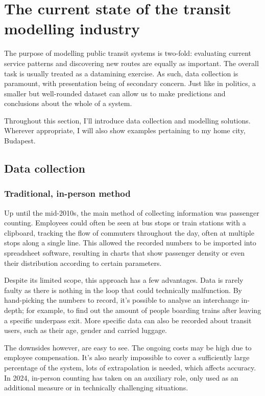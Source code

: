 \chapter{The current state of the transit modelling industry}
The purpose of modelling public transit systems is two-fold: evaluating current service patterns and discovering new routes are equally as important. The overall task is usually treated as a datamining exercise. As such, data collection is paramount, with presentation being of secondary concern. Just like in politics, a smaller but well-rounded dataset can allow us to make predictions and conclusions about the whole of a system.

Throughout this section, I'll introduce data collection and modelling solutions. Wherever appropriate, I will also show examples pertaining to my home city, Budapest.

\section{Data collection}
\subsection{Traditional, in-person method}

Up until the mid-2010s, the main method of collecting information was passenger counting. Employees could often be seen at bus stops or train stations with a clipboard, tracking the flow of commuters throughout the day, often at multiple stops along a single line. This allowed the recorded numbers to be imported into spreadsheet software, resulting in charts that show passenger density or even their distribution according to certain parameters.

Despite its limited scope, this approach has a few advantages. Data is rarely faulty as there is nothing in the loop that could technically malfunction. By hand-picking the numbers to record, it's possible to analyse an interchange in-depth; for example, to find out the amount of people boarding trains after leaving a specific underpass exit. More specific data can also be recorded about transit users, such as their age, gender and carried luggage.

The downsides however, are easy to see. The ongoing costs may be high due to employee compensation. It's also nearly impossible to cover a sufficiently large percentage of the system, lots of extrapolation is needed, which affects accuracy. In 2024, in-person counting has taken on an auxiliary role, only used as an additional measure or in technically challenging situations.

